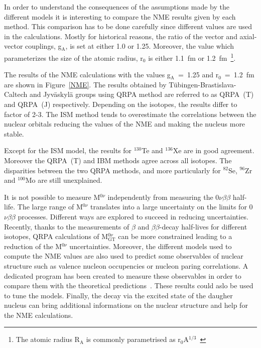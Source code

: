 \documentclass[main.tex]{subfiles}
\begin{document}
\NI In order to understand the consequences of the assumptions made by the different models it is interesting to compare the NME results given by each method. This comparison has to be done carefully since different values are used in the calculations. Mostly for historical reasons, the ratio of the vector and axial-vector couplings, g$_{\text{A}}$, is set at either 1.0 or 1.25. Moreover, the value which parameterizes the size of the atomic radius, r$_0$ is either 1.1~fm or 1.2~fm~\footnote{The atomic radius R$_\text{A}$ is commonly parametrised as r$_0$A$^{\text{1/3}}$~\cite{RadiusNucleus}}.


\bigskip


\NI The results of the NME calculations with the values g$_{\text{A}}$~=~1.25 and r$_0$~=~1.2~fm are shown in Figure~\ref{NME}. The results obtained by Tübingen-Brastislava-Caltech and Jyväskylä groups using QRPA method are referred to as QRPA~(T) and QRPA~(J) respectively. Depending on the isotopes, the results differ to factor of 2-3. The ISM method tends to overestimate the correlations between the nuclear orbitals reducing the values of the NME and making the nucleus more stable. 


\bigskip


\NI Except for the ISM model, the results for $^{\text{130}}$Te and $^{\text{136}}$Xe are in good agreement. Moreover the QRPA~(T) and IBM methods agree across all isotopes. The disparities between the two QRPA methods, and more particularly for $^{\text{82}}$Se, $^{\text{96}}$Zr and $^{\text{100}}$Mo are still unexplained. 


\bigskip


\NI It is not possible to measure M$^{0\nu}$  independently from measuring the 0$\nu\beta\beta$ half-life. The large range of M$^{0\nu}$ translates into a large uncertainty on the limits for 0$\nu\beta\beta$ processes. Different ways are explored to succeed in reducing uncertainties. Recently, thanks to the measurements of $\beta$ and $\beta\beta$-decay half-lives for different isotopes, QRPA calculations of M$_{\text{GT}}^{0\nu}$ can be more constrained leading to a reduction of the M$^{0\nu}$ uncertainties. Moreover, the different models used to compute the NME values are also used to predict some observables of nuclear structure such as valence nucleon occupencies or nucleon paring correlations. A dedicated program has been created to measure these observables in order to compare them with the theoretical predictions~\cite{ReduceNMEuncertainties}. These results could aslo be used to tune the models. Finally, the decay via the excited state of the daugher nucleus can bring additional informations on the nuclear structure and help for the NME calculations. 
\end{document}
